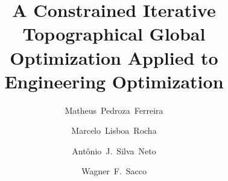 \begin{frontmatter}

\title{A Constrained Iterative Topographical Global \\ Optimization Applied to Engineering Optimization}





\author[label1]{Matheus~Pedroza~Ferreira}

\author[label1]{Marcelo~Lisboa~Rocha}

\author[label2]{Ant\^onio~J.~Silva~Neto}

\author[label3]{Wagner~F.~Sacco}



\address[label1]{Departamento de Ci\^encia da Computa\c{c}\~ao, Universidade Federal do Tocantins, Quadra 109 Norte, Avenida NS-15, ALCNO-14, Palmas, Tocantins, Brazil}

\address[label2]{Departamento de Engenharia Mec\^anica e Energia, Instituto Polit\'ecnico, Universidade do Estado do Rio de Janeiro IPRJ/UERJ, RJ, Brazil}

\address[label3]{Instituto de Engenharia e Geociências, Universidade Federal do Oeste do Pará, PA, Brazil}













\iffalse





\end{frontmatter}
